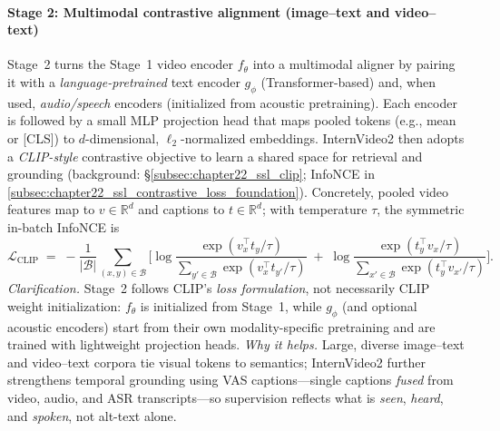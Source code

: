 \begin{enrichment}
\begin{enrichment}
        \paragraph{Stage 2: Multimodal contrastive alignment (image–text and video–text)}
        Stage~2 turns the Stage~1 video encoder $f_\theta$ into a multimodal aligner by pairing it with a \emph{language-pretrained} text encoder $g_\phi$ (Transformer-based) and, when used, \emph{audio/speech} encoders (initialized from acoustic pretraining). Each encoder is followed by a small MLP projection head that maps pooled tokens (e.g., mean or [CLS]) to $d$-dimensional, $\ell_2$-normalized embeddings. InternVideo2 then adopts a \emph{CLIP-style} contrastive objective to learn a shared space for retrieval and grounding (background: \S\ref{subsec:chapter22_ssl_clip}; InfoNCE in \eqref{subsec:chapter22_ssl_contrastive_loss_foundation}). Concretely, pooled video features map to $v\in\mathbb{R}^d$ and captions to $t\in\mathbb{R}^d$; with temperature $\tau$, the symmetric in-batch InfoNCE is
        \begin{equation}
            \mathcal{L}_{\text{CLIP}} \;=\; -\frac{1}{|\mathcal{B}|} \sum_{(x,y)\in\mathcal{B}} \Big[ \log \frac{\exp(v_x^\top t_y/\tau)}{ \sum\limits_{y'\in\mathcal{B}} \exp(v_x^\top t_{y'}/\tau) } \;+\;
            \log \frac{ \exp(t_y^\top v_x/\tau) }{ \sum\limits_{x'\in\mathcal{B}} \exp(t_y^\top v_{x'}/\tau) } \Big].
            \label{eq:chapter24_iv2_clip}
        \end{equation}
        \emph{Clarification.} Stage~2 follows CLIP’s \emph{loss formulation}, not necessarily CLIP weight initialization: $f_\theta$ is initialized from Stage~1, while $g_\phi$ (and optional acoustic encoders) start from their own modality-specific pretraining and are trained with lightweight projection heads. \emph{Why it helps.} Large, diverse image–text and video–text corpora tie visual tokens to semantics; InternVideo2 further strengthens temporal grounding using VAS captions—single captions \emph{fused} from video, audio, and ASR transcripts—so supervision reflects what is \emph{seen}, \emph{heard}, and \emph{spoken}, not alt-text alone.
        

\end{enrichment}
\end{enrichment}
